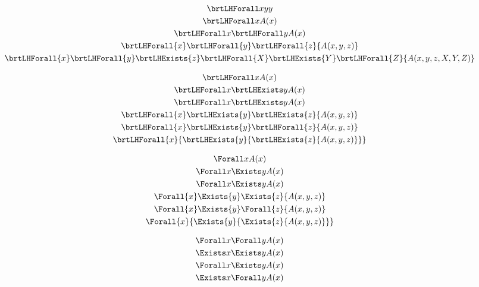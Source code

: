 \documentclass{article}
\begin{document}
    \ExplSyntaxOn

    \begin{gather}
        \brtLHForall x {yy}
        \\
        \brtLHForall x {A(x)}
        \\
        \brtLHForall x \brtLHForall y {A(x)}
        \\
        \brtLHForall {x} \brtLHForall {y} \brtLHForall {z} {A(x,y,z)}
        \\
        \brtLHForall {x} \brtLHForall {y} \brtLHExists {z}
        \brtLHForall {X} \brtLHExists {Y} \brtLHForall {Z}
        {A(x,y,z,X,Y,Z)}
    \end{gather}

    \begin{gather}
        \brtLHForall x {A(x)}
        \\
        \brtLHForall x \brtLHExists y {A(x)}
        \\
        \brtLHForall x {\brtLHExists y {A(x)}}
        \\
        \brtLHForall {x} \brtLHExists {y} \brtLHExists {z} {A(x,y,z)}
        \\
        \brtLHForall {x} \brtLHExists {y} \brtLHForall {z} {A(x,y,z)}
        \\
        \brtLHForall {x} { \brtLHExists {y} {\brtLHExists {z} {A(x,y,z)} }}
    \end{gather}

    \begin{gather}
        \Forall x {A(x)}
        \\
        \Forall x \Exists y {A(x)}
        \\
        \Forall x {\Exists y {A(x)}}
        \\
        \Forall {x} \Exists {y} \Exists {z} {A(x,y,z)}
        \\
        \Forall {x} \Exists {y} \Forall {z} {A(x,y,z)}
        \\
        \Forall {x} { \Exists {y} {\Exists {z} {A(x,y,z)} }}
    \end{gather}

    \begin{gather}
        \Forall x \Forall y {A(x)}
        \\
        \Exists x \Exists y {A(x)}
        \\
        \Forall x \Exists y {A(x)}
        \\
        \Exists x \Forall y {A(x)}
    \end{gather}

    \ExplSyntaxOff
\end{document}
